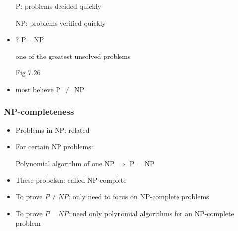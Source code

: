 \begin{frame}[allowframebreaks]
\begin{itemize}
P: problems decided quickly

NP: problems verified quickly
\item ? P= NP

one of the greatest unsolved problems

Fig 7.26

\item most believe P $\neq $ NP
\end{itemize}\end{frame} \begin{frame}[allowframebreaks] \frametitle{NP-completeness}
  \begin{itemize}
\item Problems in NP: related

\item For certain NP problems:

Polynomial algorithm of one NP $\Rightarrow$ P = NP



\item These probelsm: called NP-complete
\item To prove $P \neq NP$: only need to focus on
NP-complete problems
\item To prove $P=NP$: need only polynomial algorithms
for an NP-complete problem
\end{itemize}
\end{frame}

